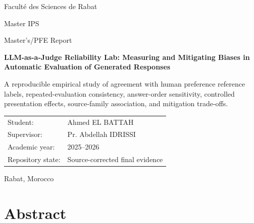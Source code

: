 \documentclass[12pt,a4paper,oneside]{report}
\newcommand{\projecttitle}{LLM-as-a-Judge Reliability Lab: Measuring and Mitigating Biases in Automatic Evaluation of Generated Responses}
\begin{document}
\begin{titlepage}
\centering
{\Large Faculté des Sciences de Rabat\par}
\vspace{0.25cm}
{\large Master IPS\par}
\vspace{1.4cm}
{\Large Master's/PFE Report\par}
\vspace{1.1cm}
{\huge\bfseries \projecttitle\par}
\vspace{1.2cm}
\begin{minipage}{0.82\textwidth}\centering
\large A reproducible empirical study of agreement with human preference reference labels, repeated-evaluation consistency, answer-order sensitivity, controlled presentation effects, source-family association, and mitigation trade-offs.
\end{minipage}
\vfill
\begin{tabular}{ll}
Student: & Ahmed EL BATTAH\\
Supervisor: & Pr. Abdellah IDRISSI\\
Academic year: & 2025--2026\\
Repository state: & Source-corrected final evidence\\
\end{tabular}
\vfill
{\large Rabat, Morocco\par}
\end{titlepage}

\chapter*{Abstract}

\tableofcontents
\clearpage
{}








\appendix





\end{document}
